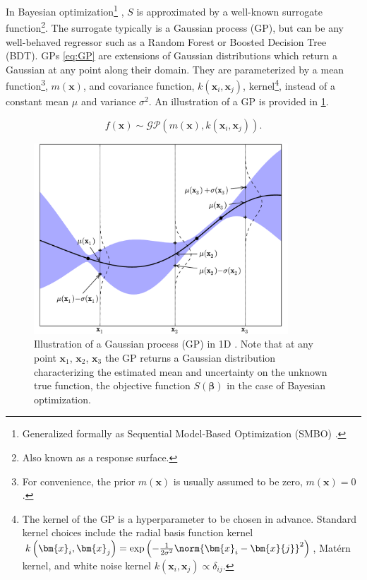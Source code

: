 In Bayesian optimization\footnote{Generalized
formally as Sequential Model-Based Optimization (SMBO) \cite{NIPS2011_4443}.} \cite{Brochu2010,1301.1942,Borisyak,NIPS2011_4443},
$S$ is approximated by a well-known surrogate function\footnote{Also known as a response surface.}.
The surrogate typically is a Gaussian process (GP),
but can be any well-behaved regressor such as
a Random Forest or Boosted Decision Tree (BDT).
GPs \cref{eq:GP} are
extensions of Gaussian distributions which return a Gaussian at any point along their domain.
They are parameterized by a mean function\footnote{For convenience,
the prior $m\left(\bm{x}\right)$ is usually assumed to be zero, $m\left(\bm{x}\right)=0$.}, $m\left(\bm{x}\right)$,
and covariance function, $k\left(\bm{x}_{i}, \bm{x}_{j}\right)$,
\ie kernel\footnote{The kernel of the GP is a hyperparameter to be chosen in advance.
Standard kernel choices include
the radial basis function kernel $k\left(\bm{x}_{i}, \bm{x}_{j}\right) = \exp\left(-\frac{1}{2\sigma^{2}}\norm{\bm{x}_{i}-\bm{x}{j}}^{2}\right)$,
Mat\'{e}rn kernel,
and white noise kernel $k\left(\bm{x}_{i}, \bm{x}_{j}\right) \propto \delta_{ij}$.},
instead of a constant mean $\mu$ and variance $\sigma^{2}$.
An illustration of a GP is provided in \cref{fig:GP_ex}.

\begin{equation}\label{eq:GP}
f\left(\bm{x}\right) \sim \mathcal{GP}\left(m\left(\bm{x}\right), k\left(\bm{x}_{i}, \bm{x}_{j}\right)\right).
\end{equation}

\begin{figure}[H] %
\centering
\includegraphics[width=0.85\textwidth]{figures/ml/gp}
\caption{
Illustration of a Gaussian process (GP) in 1D \cite{Brochu2010}.
Note that at any point $\bm{x}_{1}$, $\bm{x}_{2}$, $\bm{x}_{3}$ the GP
returns a Gaussian distribution characterizing the estimated mean and uncertainty on the
unknown true function, \ie the objective function $S\left(\bm{\beta}\right)$ in the case of Bayesian optimization.
}
\label{fig:GP_ex}
\end{figure}

